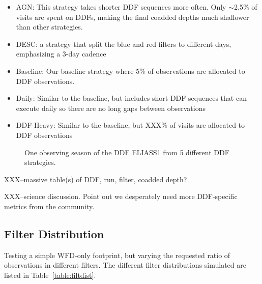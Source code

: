 \begin{itemize}
    \item{AGN: This strategy takes shorter DDF sequences more often. Only $\sim$2.5\% of visits are spent on DDFs, making the final coadded depths much shallower than other strategies.}
    \item{DESC: a strategy that split the blue and red filters to different days, emphasizing a 3-day cadence}
    \item{Baseline:  Our baseline strategy where 5\% of observations are allocated to DDF observations.}
    \item{Daily: Similar to the baseline, but includes short DDF sequences that can execute daily so there are no long gaps between observations}
    \item{DDF Heavy:  Similar to the baseline, but XXX\% of visits are allocated to DDF observations}
\end{itemize}


\begin{figure}
\caption{One observing season of the DDF ELIASS1 from 5 different DDF strategies. }\label{fig:ddfexamples}
\end{figure}

XXX--massive table(s) of DDF, run, filter, coadded depth?

XXX--science discussion.  Point out we desperately need more DDF-specific metrics from the community. 


\subsection{Filter Distribution}

Testing a simple WFD-only footprint, but varying the requested ratio of observations in different filters. The different filter distributions simulated are listed in Table~\ref{table:filtdist}.  

